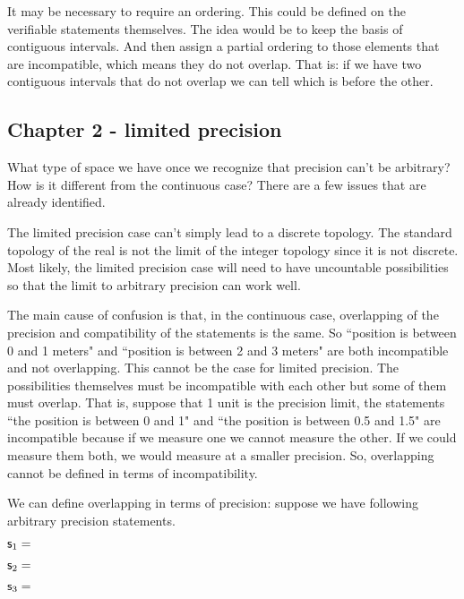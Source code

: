 \documentclass[11pt,letterpaper,fleqn]{memoir} %
\begin{document}
It may be necessary to require an ordering. This could be defined on the verifiable statements themselves. The idea would be to keep the basis of contiguous intervals. And then assign a partial ordering to those elements that are incompatible, which means they do not overlap. That is: if we have two contiguous intervals that do not overlap we can tell which is before the other.

\subsection{Chapter 2 - limited precision}

What type of space we have once we recognize that precision can't be arbitrary? How is it different from the continuous case? There are a few issues that are already identified.

The limited precision case can't simply lead to a discrete topology. The standard topology of the real is not the limit of the integer topology since it is not discrete. Most likely, the limited precision case will need to have uncountable possibilities so that the limit to arbitrary precision can work well.

The main cause of confusion is that, in the continuous case, overlapping of the precision and compatibility of the statements is the same. So ``position is between 0 and 1 meters" and ``position is between 2 and 3 meters" are both incompatible and not overlapping. This cannot be the case for limited precision. The possibilities themselves must be incompatible with each other but some of them must overlap. That is, suppose that 1 unit is the precision limit, the statements ``the position is between 0 and 1" and ``the position is between 0.5 and 1.5" are incompatible because if we measure one we cannot measure the other. If we could measure them both, we would measure at a smaller precision. So, overlapping cannot be defined in terms of incompatibility.

We can define overlapping in terms of precision: suppose we have following arbitrary precision statements.
\begin{description}
	\item $\mathsf{s}_1=$
	\item $\mathsf{s}_2=$
	\item $\mathsf{s}_3=$
\end{description}
\end{document}
